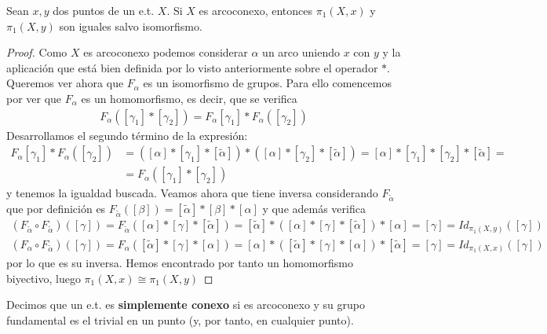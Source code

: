 \begin{teo}
    Sean $x,y$ dos puntos de un e.t. $X$. Si $X$ es arcoconexo, entonces $\pi_1(X,x)$ y $\pi_1(X,y)$ son iguales salvo isomorfismo.
    \begin{proof}
        Como $X$ es arcoconexo podemos considerar $\alpha$ un arco uniendo $x$ con $y$ y la aplicación
        que está bien definida por lo visto anteriormente sobre el operador $\ast$. Queremos ver ahora que $F_\alpha$ es un isomorfismo de grupos. Para ello comencemos por ver que $F_\alpha$ es un homomorfismo, es decir, que se verifica
        \begin{gather*}
            F_\alpha([\gamma_1] \ast [\gamma_2]) = F_\alpha[\gamma_1]\ast F_\alpha([\gamma_2])
        \end{gather*}
        Desarrollamos el segundo término de la expresión:
        \begin{align*}
            F_\alpha[\gamma_1]\ast F_\alpha([\gamma_2]) &= ([\alpha] \ast [\gamma_1] \ast [\tilde{\alpha}]) \ast ([\alpha] \ast [\gamma_2] \ast [\tilde{\alpha}]) = [\alpha] \ast [\gamma_1] \ast [\gamma_2] \ast [\tilde{\alpha}] =\\
            &= F_\alpha([\gamma_1] \ast [\gamma_2])
        \end{align*}
        y tenemos la igualdad buscada. Veamos ahora que tiene inversa considerando $F_{\tilde{\alpha}}$ que por definición es $F_{\tilde{\alpha}}([\beta]) = [\tilde{\alpha}] \ast [\beta] \ast [\alpha]$ y que además verifica
        \begin{gather*}
            (F_{\tilde{\alpha}} \circ F_{\tilde{\alpha}})([\gamma]) = F_{\tilde{\alpha}}([\alpha]\ast [\gamma]\ast [\tilde{\alpha}]) = [\tilde{\alpha}] \ast ([\alpha]\ast [\gamma]\ast [\tilde{\alpha}]) \ast [\alpha] = [\gamma] = Id_{\pi_1(X,y)}([\gamma])\\
            (F_\alpha \circ F_{\tilde{\alpha}})([\gamma]) = F_\alpha([\tilde{\alpha}] \ast [\gamma] \ast [\alpha]) = [\alpha] \ast ([\tilde{\alpha}] \ast [\gamma] \ast [\alpha]) \ast [\tilde{\alpha}] = [\gamma] = Id_{\pi_1(X,x)}([\gamma])
        \end{gather*}
        por lo que es su inversa. Hemos encontrado por tanto un homomorfismo biyectivo, luego $\pi_1(X,x) \cong \pi_1(X,y)$
    \end{proof}
\end{teo}

\begin{definicion}
    Decimos que un e.t. es \textbf{simplemente conexo} si es arcoconexo y su grupo fundamental es el trivial en un punto (y, por tanto, en cualquier punto).
\end{definicion}

